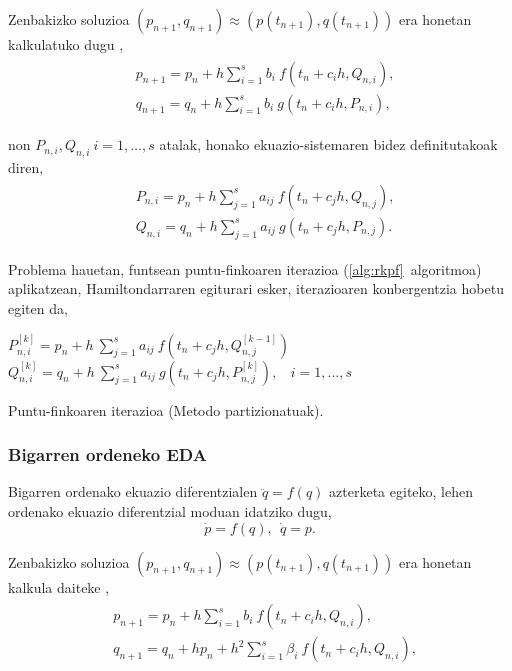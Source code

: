 Zenbakizko soluzioa $(p_{n+1},q_{n+1}) \approx (p(t_{n+1}),q(t_{n+1}))$ era honetan kalkulatuko dugu \cite{JMSanz-Serna1994},
\begin{align}
\begin{split}
&p_{n+1}=p_n+ h \sum\limits_{i=1}^{s} b_i \ f(t_n+c_ih,Q_{n,i}),\\
&q_{n+1}=q_n+ h \sum\limits_{i=1}^{s} b_i \ g(t_n+c_ih,P_{n,i}),
\end{split}
\end{align}

non $P_{n,i},Q_{n,i} \ i=1,\dots,s$ atalak, honako ekuazio-sistemaren bidez definitutakoak diren, 
\begin{align}
\begin{split}
&P_{n,i} =p_n+ h \sum\limits_{j=1}^{s} a_{ij} \ f(t_n+c_jh,Q_{n,j}), \\
&Q_{n,i} =q_n+ h \sum\limits_{j=1}^{s} a_{ij} \ g(t_n+c_jh,P_{n,j}).
\end{split}
\end{align}

Problema hauetan,  funtsean puntu-finkoaren iterazioa (\ref{alg:rkpf}~algoritmoa) aplikatzean, Hamiltondarraren egiturari esker, iterazioaren konbergentzia hobetu egiten da,   

\begin{algorithm}[H]
  {
  \BlankLine
   $P_{n,i}^{[k]}=p_{n}+ h \ \sum\limits_{j=1}^{s} a_{ij} \ f(t_n+c_jh,Q_{n,j}^{[k-1]})$\; 
   $Q_{n,i}^{[k]}=q_{n}+ h \ \sum\limits_{j=1}^{s} a_{ij} \ g(t_n+c_jh,P_{n,j}^{[k]}), \ \ \ \ i=1,\dots,s $\; 
  }
 \caption{Puntu-finkoaren iterazioa (Metodo partizionatuak).}
 \label{alg:rkfppart}
\end{algorithm}


\subsubsection*{Bigarren ordeneko EDA}

Bigarren ordenako ekuazio diferentzialen $\ddot{q}=f(q)$ azterketa egiteko, lehen ordenako ekuazio diferentzial moduan idatziko dugu,
\begin{equation*}
\dot{p}=f(q), \ \ \dot{q}=p.
\end{equation*}

Zenbakizko soluzioa $(p_{n+1},q_{n+1}) \approx (p(t_{n+1}),q(t_{n+1}))$ era honetan kalkula daiteke \cite{JMSanz-Serna1994},
\begin{align}
\begin{split}
&p_{n+1}=p_n+ h \sum\limits_{i=1}^{s} b_i \ f(t_n+c_ih,Q_{n,i}),\\
&q_{n+1}=q_n+ h p_{n} + h^2 \sum\limits_{i=1}^{s} \beta_i \ f(t_n+c_ih,Q_{n,i}),
\end{split}
\end{align}

